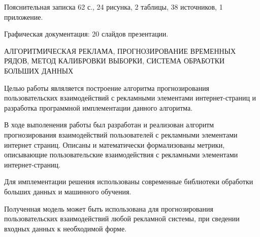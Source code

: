 Пояснительная записка 62 с., 24 рисунка, 2 таблицы, 38 источников, 1 приложение.

Графическая документация: 20 слайдов презентации.

АЛГОРИТМИЧЕСКАЯ РЕКЛАМА, ПРОГНОЗИРОВАНИЕ ВРЕМЕННЫХ РЯДОВ, МЕТОД КАЛИБРОВКИ ВЫБОРКИ, СИСТЕМА ОБРАБОТКИ
БОЛЬШИХ ДАННЫХ

Целью работы являляется построение алгоритма прогнозирования пользовательских взаимодействий
с рекламными элементами интернет-страниц и разработка программной имплементации данного
алгоритма.

В ходе выполенения работы был разработан и реализован алгоритм прогнозирования взаимодействий
пользователей с рекламными элементами интернет страниц. Описаны и математически формализованы
метрики, описывающие пользовательские взаимодействия с рекламными элементами интернет-страниц.

Для имплементации решения использованы современные библиотеки обработки больших данных 
и машинного обучения.

Полученная модель может быть использована для прогнозирования пользовательских взаимодействий
любой рекламной системы, при сведении входных данных к необходимой форме.

